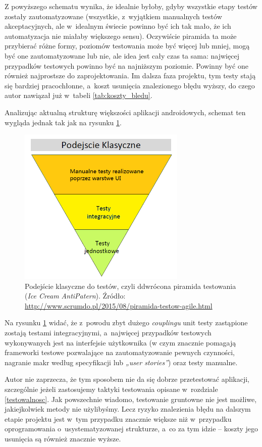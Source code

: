 \newpage
Z powyższego schematu wynika, że idealnie byłoby, gdyby wszystkie etapy testów zostały zautomatyzowane (wszystkie, z~wyjątkiem manualnych testów akceptacyjnych, ale w~idealnym świecie powinno być ich tak mało, że ich automatyzacja nie miałaby większego sensu). Oczywiście piramida ta może przybierać różne formy, poziomów testowania może być więcej lub mniej, mogą być one zautomatyzowane lub nie, ale idea jest cały czas ta sama: najwięcej przypadków testowych powinno być na najniższym poziomie. Powinny być one również najprostsze do zaprojektowania. Im dalsza faza projektu, tym testy stają się bardziej pracochłonne, a~koszt usunięcia znalezionego błędu wyższy, do czego autor nawiązał już w~tabeli \ref{tab:koszty_bledu}.

Analizując aktualną strukturę większości aplikacji androidowych, schemat ten wygląda jednak tak jak na rysunku \ref{fig:odwrocona_piramida}.

\begin{figure}[!htb]
    \centering
    \includegraphics[width=8cm]{imgs/ch3_odwrocona_piramida.png}
    \caption
{Podejście klasyczne do testów, czyli ddwrócona piramida testowania (\textit{Ice Cream AntiPatern}). Źródło: \url{http://www.scrumdo.pl/2015/08/piramida-testow-agile.html}}
    \label{fig:odwrocona_piramida}
\end{figure} 

\newpage
Na rysunku \ref{fig:odwrocona_piramida} widać, że z~powodu zbyt dużego \textit{couplingu} unit testy zastąpione zostają testami integracyjnymi, a~najwięcej przypadków testowych wykonywanych jest na interfejsie użytkownika (w czym znacznie pomagają frameworki testowe pozwalające na zautomatyzowanie pewnych czynności, nagranie makr według specyfikacji lub \textit{„user stories”}) oraz testy manualne.

Autor nie zaprzecza, że tym sposobem nie da się dobrze przetestować aplikacji, szczególnie jeżeli zastosujemy taktyki testowania opisane w~rozdziale \ref{testowalnosc}. Jak powszechnie wiadomo, testowanie gruntowne nie jest możliwe, jakiejkolwiek metody nie użylibyśmy. Lecz ryzyko znalezienia błędu na dalszym etapie projektu jest w~tym przypadku znacznie większe niż w~przypadku oprogramowania o~usystematyzowanej strukturze, a~co za tym idzie – koszty jego usunięcia są również znacznie wyższe.

